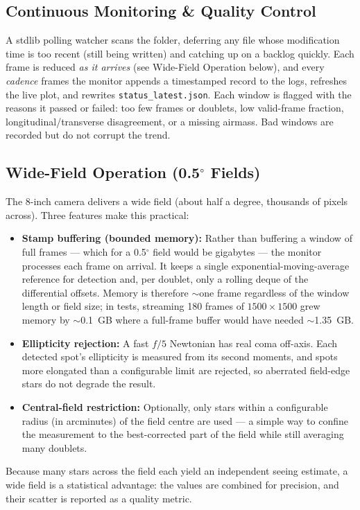 \documentclass[11pt,a4paper]{article}
\begin{document}
\subsection{Continuous Monitoring \& Quality Control}
A stdlib polling watcher scans the folder, deferring any file whose modification time is too recent (still being written) and catching up on a backlog quickly. Each frame is reduced \emph{as it arrives} (see Wide-Field Operation below), and every \emph{cadence} frames the monitor appends a timestamped record to the logs, refreshes the live plot, and rewrites \texttt{status\_latest.json}. Each window is flagged with the reasons it passed or failed: too few frames or doublets, low valid-frame fraction, longitudinal/transverse disagreement, or a missing airmass. Bad windows are recorded but do not corrupt the trend.

\subsection{Wide-Field Operation (0.5$^\circ$ Fields)}
The 8-inch camera delivers a wide field (about half a degree, thousands of pixels across). Three features make this practical:
\begin{itemize}[leftmargin=*]
    \item \textbf{Stamp buffering (bounded memory):} Rather than buffering a window of full frames --- which for a 0.5$^\circ$ field would be gigabytes --- the monitor processes each frame on arrival. It keeps a single exponential-moving-average reference for detection and, per doublet, only a rolling deque of the differential offsets. Memory is therefore $\sim$one frame regardless of the window length or field size; in tests, streaming 180 frames of $1500\times1500$ grew memory by $\sim$0.1~GB where a full-frame buffer would have needed $\sim$1.35~GB.
    \item \textbf{Ellipticity rejection:} A fast $f/5$ Newtonian has real coma off-axis. Each detected spot's ellipticity is measured from its second moments, and spots more elongated than a configurable limit are rejected, so aberrated field-edge stars do not degrade the result.
    \item \textbf{Central-field restriction:} Optionally, only stars within a configurable radius (in arcminutes) of the field centre are used --- a simple way to confine the measurement to the best-corrected part of the field while still averaging many doublets.
\end{itemize}
Because many stars across the field each yield an independent seeing estimate, a wide field is a statistical advantage: the values are combined for precision, and their scatter is reported as a quality metric.
\end{document}
